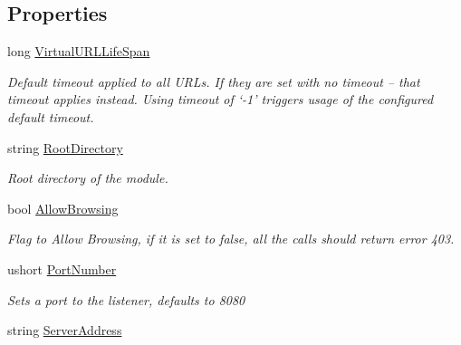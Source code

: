 \subsection*{Properties}
\begin{DoxyCompactItemize}
\item 
long \mbox{\hyperlink{class_concord_1_1_c3_http_module_1_1_web_server_ac992bf483d0f40c39532bb3b320f2a75}{Virtual\+U\+R\+L\+Life\+Span}}
\begin{DoxyCompactList}\small\item\em Default timeout applied to all U\+R\+Ls. If they are set with no timeout – that timeout applies instead. Using timeout of ‘-\/1’ triggers usage of the configured default timeout. \end{DoxyCompactList}\item 
string \mbox{\hyperlink{class_concord_1_1_c3_http_module_1_1_web_server_a38a773f41d735c63da0fe09a5b6f08c2}{Root\+Directory}}
\begin{DoxyCompactList}\small\item\em Root directory of the module. \end{DoxyCompactList}\item 
bool \mbox{\hyperlink{class_concord_1_1_c3_http_module_1_1_web_server_ac38109b56ad34adee4a2a538c4101c98}{Allow\+Browsing}}
\begin{DoxyCompactList}\small\item\em Flag to Allow Browsing, if it is set to false, all the calls should return error 403. \end{DoxyCompactList}\item 
ushort \mbox{\hyperlink{class_concord_1_1_c3_http_module_1_1_web_server_a7f9d7208d0877507622dcfacbd3bcc97}{Port\+Number}}
\begin{DoxyCompactList}\small\item\em Sets a port to the listener, defaults to 8080 \end{DoxyCompactList}\item 
string \mbox{\hyperlink{class_concord_1_1_c3_http_module_1_1_web_server_a9a5def732b3afd8530271b7a8de16591}{Server\+Address}}

\end{DoxyCompactItemize}
